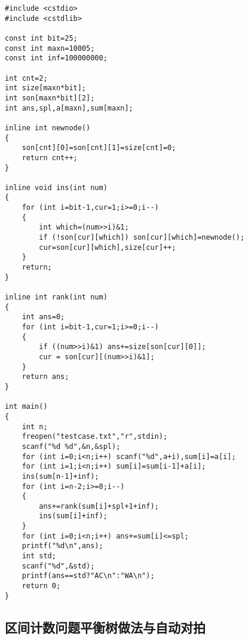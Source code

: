 \documentclass{article}
\begin{document}
\begin{lstlisting}
#include <cstdio>
#include <cstdlib>

const int bit=25;
const int maxn=10005;
const int inf=100000000;

int cnt=2;
int size[maxn*bit];
int son[maxn*bit][2];
int ans,spl,a[maxn],sum[maxn];

inline int newnode()
{
    son[cnt][0]=son[cnt][1]=size[cnt]=0;
    return cnt++;
}

inline void ins(int num)
{
    for (int i=bit-1,cur=1;i>=0;i--)
    {
        int which=(num>>i)&1;
        if (!son[cur][which]) son[cur][which]=newnode();
        cur=son[cur][which],size[cur]++;
    }
    return;
}

inline int rank(int num)
{
    int ans=0;
    for (int i=bit-1,cur=1;i>=0;i--)
    {
        if ((num>>i)&1) ans+=size[son[cur][0]];
        cur = son[cur][(num>>i)&1];
    }
    return ans;
}

int main()
{
    int n;
    freopen("testcase.txt","r",stdin);
    scanf("%d %d",&n,&spl);
    for (int i=0;i<n;i++) scanf("%d",a+i),sum[i]=a[i];
    for (int i=1;i<n;i++) sum[i]=sum[i-1]+a[i];
    ins(sum[n-1]+inf);
    for (int i=n-2;i>=0;i--)
    {
        ans+=rank(sum[i]+spl+1+inf);
        ins(sum[i]+inf);
    }
    for (int i=0;i<n;i++) ans+=sum[i]<=spl;
    printf("%d\n",ans);
    int std;
    scanf("%d",&std);
    printf(ans==std?"AC\n":"WA\n");
    return 0;
}
\end{lstlisting}

\subsection{区间计数问题平衡树做法与自动对拍}
\end{document}
